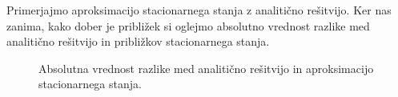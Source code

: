 \documentclass[slovene,11pt,a4paper]{article}
\numberwithin{equation}{section} %
\numberwithin{figure}{section} %
\numberwithin{table}{section} %
\begin{document}
Primerjajmo aproksimacijo stacionarnega stanja z analitično rešitvijo. Ker nas zanima, kako dober je približek si oglejmo absolutno vrednost razlike med analitično rešitvijo in približkov stacionarnega stanja.
\begin{figure}[h]
\noindent{}

\caption{Absolutna vrednost razlike med analitično rešitvijo in aproksimacijo stacionarnega stanja.}
\end{figure}
\end{document}
